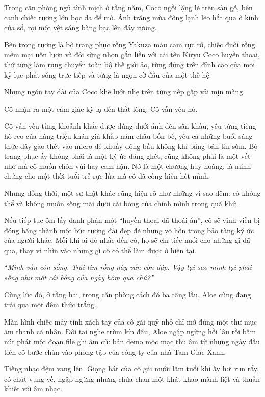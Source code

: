 ﻿\documentclass[../main.tex]{subfiles}
\begin{document}
Trong căn phòng ngủ tĩnh mịch ở tầng năm, Coco ngồi lặng lẽ trên sàn gỗ, bên cạnh chiếc rương lớn bọc da để mở. Ánh trăng mùa đông lạnh lẽo hắt qua ô kính cửa sổ, rọi một vệt sáng bàng bạc lên đáy rương.

Bên trong rương là bộ trang phục rồng Yakuza màu cam rực rỡ, chiếc đuôi rồng mềm mại uốn lượn và đôi sừng nhọn gắn liền với cái tên Kiryu Coco huyền thoại, thứ từng làm rung chuyển toàn bộ thế giới ảo, từng đứng trên đỉnh cao của mọi kỷ lục phát sóng trực tiếp và từng là ngọn cờ đầu của một thế hệ.

Những ngón tay dài của Coco khẽ lướt nhẹ trên từng nếp gấp vải mịn màng.

Cô nhận ra một cảm giác kỳ lạ đến thắt lòng: Cô vẫn yêu nó.

Cô vẫn yêu từng khoảnh khắc được đứng dưới ánh đèn sân khấu, yêu từng tiếng hò reo của hàng triệu khán giả khắp năm châu bốn bể, yêu cả những buổi sáng thức dậy gào thét vào micro để khuấy động bầu không khí bằng bản tin sớm. Bộ trang phục ấy không phải là một ký ức đáng ghét, cũng không phải là một vết nhơ mà cô muốn chôn vùi hay căm hận. Nó là một chương huy hoàng, là minh chứng cho một thời tuổi trẻ rực lửa mà cô đã cống hiến hết mình.

Nhưng đồng thời, một sự thật khác cũng hiện rõ như những vì sao đêm: cô không thể và không muốn sống mãi dưới cái bóng của chính mình trong quá khứ.

Nếu tiếp tục ôm lấy danh phận một ``huyền thoại đã thoái ẩn'', cô sẽ vĩnh viễn bị đóng băng thành một bức tượng đài đẹp đẽ nhưng vô hồn trong bảo tàng ký ức của người khác. Mỗi khi ai đó nhắc đến cô, họ sẽ chỉ tiếc nuối cho những gì đã qua, thay vì nhìn vào những gì cô có thể làm được ở hiện tại.

``\textit{Mình vẫn còn sống. Trái tim rồng này vẫn còn đập. Vậy tại sao mình lại phải sống như một cái bóng của ngày hôm qua chứ?''}

\ct

Cùng lúc đó, ở tầng hai, trong căn phòng cách đó ba tầng lầu, Aloe cũng đang trải qua một đêm thức trắng.

Màn hình chiếc máy tính xách tay của cô gái quỷ nhỏ chỉ mở đúng một thư mục âm thanh cá nhân. Đôi tai nghe trùm kín đầu, Aloe ngập ngừng hồi lâu rồi bấm nút phát một đoạn file ghi âm cũ: bản demo mộc mạc thu âm từ những ngày đầu tiên cô bước chân vào phòng tập của công ty của nhà Tam Giác Xanh.

Tiếng nhạc đệm vang lên. Giọng hát của cô gái mười lăm tuổi khi ấy hơi run rẩy, có chút vụng về, ngập ngừng nhưng chứa chan một khát khao mãnh liệt và thuần khiết với âm nhạc.
\end{document}
